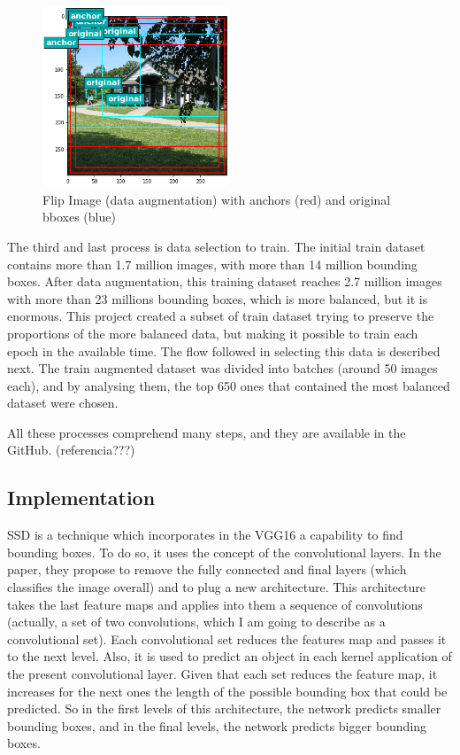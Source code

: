 \documentclass[11pt, a4paper, twocolumn]{article}
\begin{document}
\begin{figure}[!ht]
	\centering
	\includegraphics[width=0.5\textwidth]{flip-data-aug.png}
	\caption{\scriptsize Flip Image (data augmentation) with anchors (red) and original bboxes (blue)}
\end{figure}

The third and last process is data selection to train. The initial train dataset contains more than 1.7 million images, with more than 14 million bounding boxes. After data augmentation, this training dataset reaches 2.7 million images with more than 23 millions bounding boxes, which is more balanced, but it is enormous. This project created a subset of train dataset trying to preserve the proportions of the more balanced data, but making it possible to train each epoch in the available time. The flow followed in selecting this data is described next. The train augmented dataset was divided into batches (around 50 images each), and by analysing them, the top 650 ones that contained the most balanced dataset were chosen.

All these processes comprehend many steps, and they are available in the GitHub. (referencia???)

\subsection{Implementation}

SSD is a technique which incorporates in the VGG16 a capability to find bounding boxes. To do so, it uses the concept of the convolutional layers. In the paper, they propose to remove the fully connected and final layers (which classifies the image overall) and to plug a new architecture. This architecture takes the last feature maps and applies into them a sequence of convolutions (actually, a set of two convolutions, which I am going to describe as a convolutional set). Each convolutional set reduces the features map and passes it to the next level. Also, it is used to predict an object in each kernel application of the present convolutional layer. Given that each set reduces the feature map, it increases for the next ones the length of the possible bounding box that could be predicted. So in the first levels of this architecture, the network predicts smaller bounding boxes, and in the final levels, the network predicts bigger bounding boxes.
\end{document}
